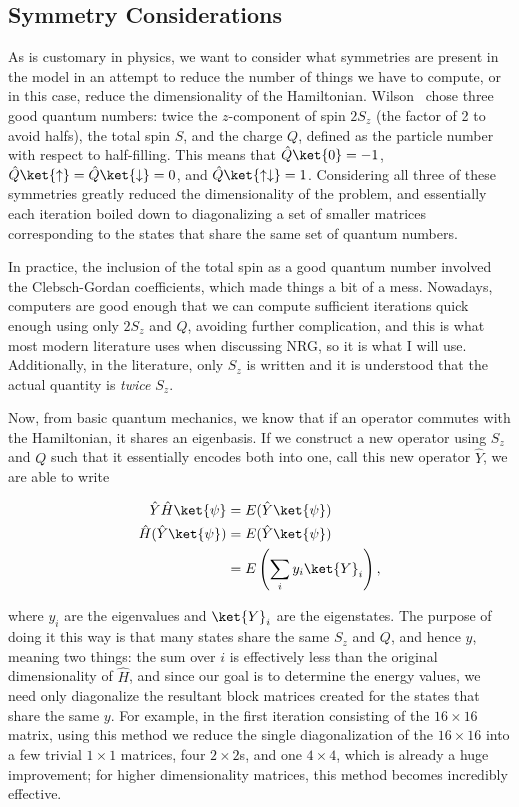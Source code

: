 \subsection{Symmetry Considerations}


As is customary in physics, we want to consider what symmetries are present in the model in an attempt to reduce the number of things we have to compute, or in this case, reduce the dimensionality of the Hamiltonian. Wilson~\cite{Wilson_1975} chose three good quantum numbers: twice the $z$-component of spin $2S_z$ (the factor of 2 to avoid halfs), the total spin $S$, and the charge $Q$, defined as the particle number with respect to half-filling. This means that $\hat{Q}\ket{0} = -1$, $\hat{Q}\ket{\uparrow} = \hat{Q}\ket{\downarrow} = 0$, and $\hat{Q}\ket{\uparrow\downarrow} = 1$. Considering all three of these symmetries greatly reduced the dimensionality of the problem, and essentially each iteration boiled down to diagonalizing a set of smaller matrices corresponding to the states that share the same set of quantum numbers.

In practice, the inclusion of the total spin as a good quantum number involved the Clebsch-Gordan coefficients, which made things a bit of a mess. Nowadays, computers are good enough that we can compute sufficient iterations quick enough using only $2S_z$ and $Q$, avoiding further complication, and this is what most modern literature uses when discussing NRG, so it is what I will use. Additionally, in the literature, only $S_z$ is written and it is understood that the actual quantity is \textit{twice} $S_z$.

Now, from basic quantum mechanics, we know that if an operator commutes with the Hamiltonian, it shares an eigenbasis. If we construct a new operator using $S_z$ and $Q$ such that it essentially encodes both into one, call this new operator $\hat{Y}$, we are able to write

\begin{align}
  \hat{Y}\hat{H}\ket{\psi} &= E(\hat{Y}\ket{\psi}) \\
  \hat{H}(\hat{Y}\ket{\psi}) &= E(\hat{Y}\ket{\psi}) \\ 
                             &= E\left( \sum_i y_i \ket{Y}_i \right),
\end{align}

where $y_i$ are the eigenvalues and $\ket{Y}_i$ are the eigenstates. The purpose of doing it this way is that many states share the same $S_z$ and $Q$, and hence $y$, meaning two things: the sum over $i$ is effectively less than the original dimensionality of $\hat{H}$, and since our goal is to determine the energy values, we need only diagonalize the resultant block matrices created for the states that share the same $y$. For example, in the first iteration consisting of the $16\times16$ matrix, using this method we reduce the single diagonalization of the $16\times16$ into a few trivial $1\times1$ matrices, four $2\times2$s, and one $4\times4$, which is already a huge improvement; for higher dimensionality matrices, this method becomes incredibly effective.

